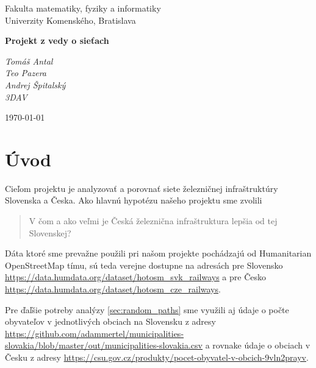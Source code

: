 \documentclass[12pt,a4paper]{article}
\begin{document}
\begin{titlepage}
  \centering

  {\large
    Fakulta matematiky, fyziky a informatiky\\
    Univerzity Komenského, Bratislava
  }\par

  \vspace{4cm}

  {\bfseries\LARGE
    Projekt z vedy o sieťach
  }\par

  \vspace{0.5cm}

  \vfill

  \begin{flushleft}
    {\itshape
      Tomáš Antal\\
      Teo Pazera\\
      Andrej Špitalský \\
      3DAV
    }
  \end{flushleft}

  \begin{flushright}
    \today
  \end{flushright}

\end{titlepage}

\newpage

\section{Úvod}
Cieľom projektu je analyzovať a porovnať siete železničnej infraštruktúry Slovenska a Česka. Ako hlavnú hypotézu našeho projektu sme zvolili \begin{quote}
    V čom a ako veľmi je Česká železnična infraštruktura lepšia od tej Slovenskej?
\end{quote} 
Dáta ktoré sme prevažne použili pri našom projekte pochádzajú od Humanitarian OpenStreetMap tímu, sú teda verejne dostupne na adresách pre Slovensko \url{https://data.humdata.org/dataset/hotosm_svk_railways} a pre Česko \url{https://data.humdata.org/dataset/hotosm_cze_railways}.

Pre ďaľšie potreby analýzy \ref{sec:random_paths} sme využili aj údaje o počte obyvateľov v jednotlivých obciach na Slovensku z adresy \url{https://github.com/adammertel/municipalities-slovakia/blob/master/out/municipalities-slovakia.csv}
a rovnake údaje o obciach v Česku z adresy \url{https://csu.gov.cz/produkty/pocet-obyvatel-v-obcich-9vln2prayv}. 





\end{document}

